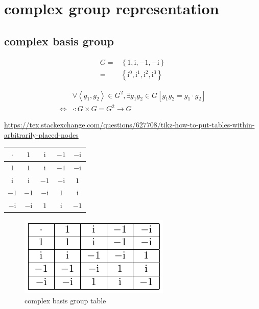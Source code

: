 \documentclass[
]{book}
\theoremstyle{definition}
\theoremstyle{definition}
\theoremstyle{definition}
\theoremstyle{definition}
\theoremstyle{remark}
\begin{document}
\hypertarget{complex-group-representation}{%
\section{complex group representation}\label{complex-group-representation}}

\hypertarget{complex-basis-group}{%
\subsection{complex basis group}\label{complex-basis-group}}

\[
\begin{aligned}
G= & \left\{ 1,\mathrm{i},-1,-\mathrm{i}\right\} \\
= & \left\{ \mathrm{i}^{0},\mathrm{i}^{1},\mathrm{i}^{2},\mathrm{i}^{3}\right\} 
\end{aligned}
\]

\[
\begin{aligned}
 & \forall\left\langle g_{{\scriptscriptstyle 1}},g_{{\scriptscriptstyle 2}}\right\rangle \in G^{2},\exists g_{{\scriptscriptstyle 1}}g_{{\scriptscriptstyle 2}}\in G\left[g_{{\scriptscriptstyle 1}}g_{{\scriptscriptstyle 2}}=g_{{\scriptscriptstyle 1}}\cdot g_{{\scriptscriptstyle 2}}\right]\\
\Leftrightarrow & \cdot:G\times G=G^{2}\rightarrow G
\end{aligned}
\]

\url{https://tex.stackexchange.com/questions/627708/tikz-how-to-put-tables-within-arbitrarily-placed-nodes}

\begin{tabular}{|c|c|c|c|c|}
\hline 
$\cdot$ & $1$ & $\mathrm{i}$ & $-1$ & $-\mathrm{i}$\tabularnewline
\hline 
$1$ & $1$ & $\mathrm{i}$ & $-1$ & $-\mathrm{i}$\tabularnewline
\hline 
$\mathrm{i}$ & $\mathrm{i}$ & $-1$ & $-\mathrm{i}$ & $1$\tabularnewline
\hline 
$-1$ & $-1$ & $-\mathrm{i}$ & $1$ & $\mathrm{i}$\tabularnewline
\hline 
$-\mathrm{i}$ & $-\mathrm{i}$ & $1$ & $\mathrm{i}$ & $-1$\tabularnewline
\hline 
\end{tabular}

\begin{figure}
\centering
\includegraphics{202403281312-group-theory_files/figure-latex/unnamed-chunk-3-1.pdf}
\caption{\label{fig:unnamed-chunk-3}complex basis group table}
\end{figure}
\end{document}
